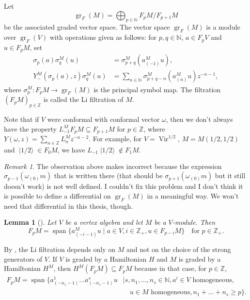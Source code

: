 \documentclass[a4paper, 12pt, reqno]{amsart}
\newtheorem{lemma}[theorem]{Lemma}
\theoremstyle{remark}
\newtheorem{remark}[theorem]{Remark}
\numberwithin{equation}{subsection}
\DeclareMathOperator{\Vir}{Vir}
\DeclareMathOperator{\gr}{gr}
\DeclareMathOperator{\vspan}{span}
\DeclareMathOperator{\vachalf}{|1/2\rangle}
\begin{document}
Let
\begin{equation*}
  \gr_F(M) = \bigoplus_{p \in \mathbb{N}}F_pM/F_{p + 1}M
\end{equation*}
be the associated graded vector space.
The vector space $\gr_F(M)$ is a module over $\gr_F(V)$ with operations given as follows: for $p, q \in \mathbb{N}$, $a \in F_pV$ and $u \in F_pM$, set
\begin{align*}
  \sigma_p(a)\sigma^M_q(u) &= \sigma^M_{p + q}(a^M_{(-1)}u), \\
  Y^M_-(\sigma_p(a), z)\sigma^M_q(u) &= \sum_{n \in \mathbb{N}}\sigma^M_{p + q - n}(a^M_{(n)}u)z^{-n - 1},
\end{align*}
where $\sigma^M_p: F_pM \to \gr_F(M)$ is the principal symbol map.
The filtration $(F_pM)_{p \in \mathbb{Z}}$ is called the Li filtration of $M$.

Note that if $V$ were conformal with conformal vector $\omega$, then we don't always have the property $L_{-1}^MF_pM \subseteq F_{p + 1}M$ for $p \in \mathbb{Z}$, where $Y(\omega, z) = \sum_{n \in \mathbb{Z}}L^M_nz^{-n - 2}$.
For example, for $V = \Vir^{1/2}$, $M = M(1/2, 1/2)$ and $\vachalf \in F_0M$, we have $L_{-1}\vachalf \notin F_1M$.

\begin{remark}
  \label{rmk:35}
  The observation above makes \cite[Lemma 3.1.2]{arakawa_remark_2012} incorrect because the expression $\sigma_{p - 1}(\omega_{(0)}m)$ that is written there (that should be $\sigma_{p + 1}(\omega_{(0)}m)$ but it still doesn't work) is not well defined.
  I couldn't fix this problem and I don't think it is possible to define a differential on $\gr_F(M)$ in a meaningful way.
  We won't need that differential in this thesis, though.
\end{remark}

\begin{lemma}[{\cite[Lemma 2.9]{li_abelianizing_2005}}]
  \label{lmm:19}
  Let $V$ be a vertex algebra and let $M$ be a $V$-module.
  Then
  \begin{equation*}
    F_pM = \vspan\{a^M_{(-i - 1)}u \mid a \in V, i \in \mathbb{Z}_+, u \in F_{p - i}M\} \quad \text{for }p \in \mathbb{Z}_+.
  \end{equation*}
\end{lemma}

By , the Li filtration depends only on $M$ and not on the choice of the strong generators of $V$.
If $V$ is graded by a Hamiltonian $H$ and $M$ is graded by a Hamiltonian $H^M$, then $H^M(F_pM) \subseteq F_pM$ because in that case, for $p \in \mathbb{Z}$,
\begin{equation*}
  \begin{split}
    F_pM = \vspan \{a^1_{(-n_1 - 1)}\dots a^s_{(-n_s - 1)}u &\mid s, n_1, \dots, n_s \in \mathbb{N}, a^i \in V\text{ homogeneous},\\
    &\quad u \in M\text{ homogeneous}, n_1 + \dots + n_s \ge p\}.
  \end{split}
\end{equation*}
\end{document}
